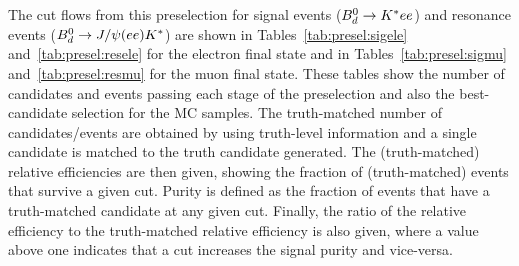 The cut flows from this preselection for signal events ($B_d^0 \to K^* ee$) and resonance events
($B_d^0 \to J/\psi(ee)K^*$) are shown in Tables~\ref{tab:presel:sigele} and~\ref{tab:presel:resele}
for the electron final state and in Tables~\ref{tab:presel:sigmu} and~\ref{tab:presel:resmu}
for the muon final state.
These tables show the number of candidates and events passing each stage of the preselection
and also the best-candidate selection for the MC samples.
The truth-matched number of candidates/events are obtained by using truth-level information
and a single candidate is matched to the truth candidate generated.
The (truth-matched) relative efficiencies are then given, showing the fraction of (truth-matched)
events that survive a given cut. Purity is defined as the fraction of events that have a%
truth-matched candidate at any given cut. Finally, the ratio of the relative efficiency
to the truth-matched relative efficiency is also given, where a value above one indicates
that a cut increases the signal purity and vice-versa.










